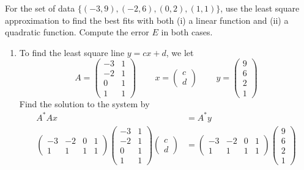 \begin{homeworkProblem}

For the set of data $\{(-3,9), (-2,6), (0,2), (1,1)\}$, use the least square
approximation to find the best fits with both (i) a linear function and (ii)
a quadratic function. Compute the error $E$ in both cases.

\solution

\begin{enumerate}[label=(\roman*)]
    \item To find the least square line $y = cx + d$, we let \[
    A = \begin{pmatrix}
        -3 & 1 \\
        -2 & 1 \\
        0 & 1 \\
        1 & 1
    \end{pmatrix}
    \quad \, \quad
    x = \begin{pmatrix}
        c \\
        d
    \end{pmatrix}
    \quad \, \quad
    y = \begin{pmatrix}
        9 \\
        6 \\
        2 \\
        1
    \end{pmatrix}
    \]Find the solution to the system by \[
    \begin{aligned}
        A^* Ax &= A^* y\\
        \begin{pmatrix}
            -3 & -2 & 0 & 1\\
            1 & 1 & 1 & 1
        \end{pmatrix}
        \begin{pmatrix}
            -3 & 1 \\
            -2 & 1 \\
            0 & 1 \\
            1 & 1
        \end{pmatrix} \begin{pmatrix} c \\ d\end{pmatrix} &= \begin{pmatrix}
            -3 & -2 & 0 & 1\\
            1 & 1 & 1 & 1
        \end{pmatrix} \begin{pmatrix}
            9 \\ 6 \\ 2 \\ 1

\end{pmatrix}
\end{aligned}\]
\end{enumerate}
\end{homeworkProblem}
